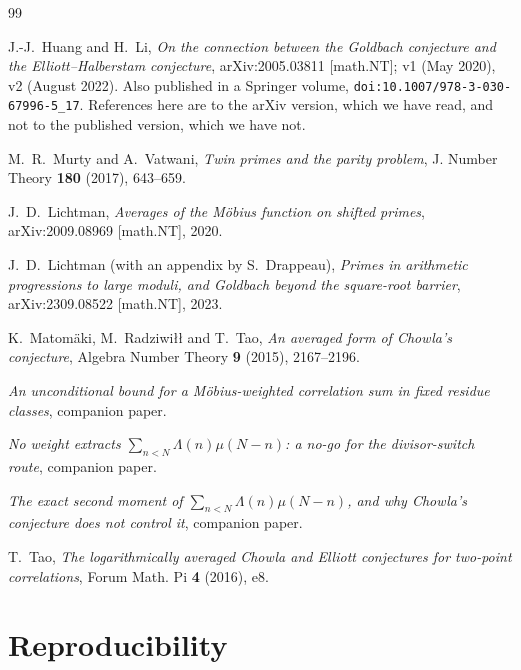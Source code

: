 \documentclass[11pt,a4paper]{article}
\theoremstyle{plain}
\theoremstyle{definition}
\theoremstyle{remark}
\begin{document}
\begin{thebibliography}{99}

 J.-J.~Huang and H.~Li, \emph{On the connection between
the Goldbach conjecture and the Elliott--Halberstam conjecture},
arXiv:2005.03811 [math.NT]; v1 (May 2020), v2 (August 2022). Also
published in a Springer volume,
\texttt{doi:10.1007/978-3-030-67996-5\_17}. References here are to the
arXiv version, which we have read, and not to the published version,
which we have not.

 M.~R.~Murty and A.~Vatwani, \emph{Twin primes and the
parity problem}, J. Number Theory \textbf{180} (2017), 643--659.

 J.~D.~Lichtman, \emph{Averages of the M\"obius function
on shifted primes}, arXiv:2009.08969 [math.NT], 2020.

 J.~D.~Lichtman (with an appendix by S.~Drappeau),
\emph{Primes in arithmetic progressions to large moduli, and Goldbach
beyond the square-root barrier}, arXiv:2309.08522 [math.NT], 2023.

 K.~Matom\"aki, M.~Radziwi{\l}{\l} and T.~Tao,
\emph{An averaged form of Chowla's conjecture}, Algebra Number Theory
\textbf{9} (2015), 2167--2196.

 \emph{An unconditional bound for a M\"obius-weighted
correlation sum in fixed residue classes}, companion paper.

 \emph{No weight extracts $\sum_{n<N}\Lambda(n)\mu(N-n)$:
a no-go for the divisor-switch route}, companion paper.

 \emph{The exact second moment of
$\sum_{n<N}\Lambda(n)\mu(N-n)$, and why Chowla's conjecture does not
control it}, companion paper.

 T.~Tao, \emph{The logarithmically averaged Chowla and
Elliott conjectures for two-point correlations}, Forum Math. Pi
\textbf{4} (2016), e8.

\end{thebibliography}

\appendix
\section{Reproducibility}
\end{document}

